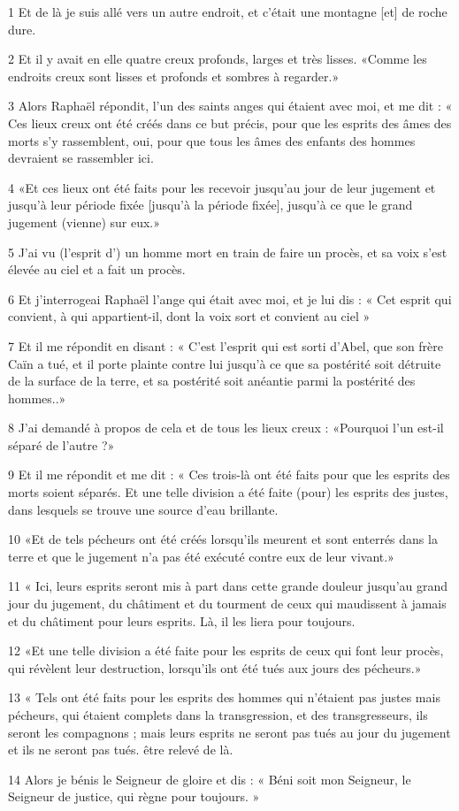 \par 1 Et de là je suis allé vers un autre endroit, et c'était une montagne [et] de roche dure.
\par 2 Et il y avait en elle quatre creux profonds, larges et très lisses. «Comme les endroits creux sont lisses et profonds et sombres à regarder.»
\par 3 Alors Raphaël répondit, l'un des saints anges qui étaient avec moi, et me dit : « Ces lieux creux ont été créés dans ce but précis, pour que les esprits des âmes des morts s'y rassemblent, oui, pour que tous les âmes des enfants des hommes devraient se rassembler ici.
\par 4 «Et ces lieux ont été faits pour les recevoir jusqu'au jour de leur jugement et jusqu'à leur période fixée [jusqu'à la période fixée], jusqu'à ce que le grand jugement (vienne) sur eux.»
\par 5 J'ai vu (l'esprit d') un homme mort en train de faire un procès, et sa voix s'est élevée au ciel et a fait un procès.
\par 6 Et j'interrogeai Raphaël l'ange qui était avec moi, et je lui dis : « Cet esprit qui convient, à qui appartient-il, dont la voix sort et convient au ciel »
\par 7 Et il me répondit en disant : « C'est l'esprit qui est sorti d'Abel, que son frère Caïn a tué, et il porte plainte contre lui jusqu'à ce que sa postérité soit détruite de la surface de la terre, et sa postérité soit anéantie parmi la postérité des hommes..»
\par 8 J'ai demandé à propos de cela et de tous les lieux creux : «Pourquoi l'un est-il séparé de l'autre ?»
\par 9 Et il me répondit et me dit : « Ces trois-là ont été faits pour que les esprits des morts soient séparés. Et une telle division a été faite (pour) les esprits des justes, dans lesquels se trouve une source d'eau brillante.
\par 10 «Et de tels pécheurs ont été créés lorsqu'ils meurent et sont enterrés dans la terre et que le jugement n'a pas été exécuté contre eux de leur vivant.»
\par 11 « Ici, leurs esprits seront mis à part dans cette grande douleur jusqu'au grand jour du jugement, du châtiment et du tourment de ceux qui maudissent à jamais et du châtiment pour leurs esprits. Là, il les liera pour toujours.
\par 12 «Et une telle division a été faite pour les esprits de ceux qui font leur procès, qui révèlent leur destruction, lorsqu'ils ont été tués aux jours des pécheurs.»
\par 13 « Tels ont été faits pour les esprits des hommes qui n'étaient pas justes mais pécheurs, qui étaient complets dans la transgression, et des transgresseurs, ils seront les compagnons ; mais leurs esprits ne seront pas tués au jour du jugement et ils ne seront pas tués. être relevé de là.
\par 14 Alors je bénis le Seigneur de gloire et dis : « Béni soit mon Seigneur, le Seigneur de justice, qui règne pour toujours. »

